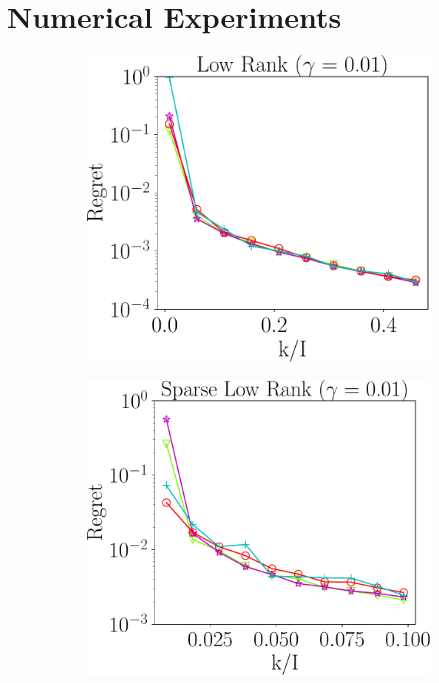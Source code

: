 \section{Numerical Experiments}\label{s-experiments}

\begin{figure}
	\centering
	\begin{subfigure}{0.3\textwidth}
		\includegraphics[scale = 0.24]{figure/fig2_lk_lnoise_600.pdf}
	\end{subfigure}
	\begin{subfigure}{0.3\textwidth}
		\includegraphics[scale = 0.24]{figure/fig2_slk_lnoise_600.pdf}

\end{subfigure}
\end{figure}
